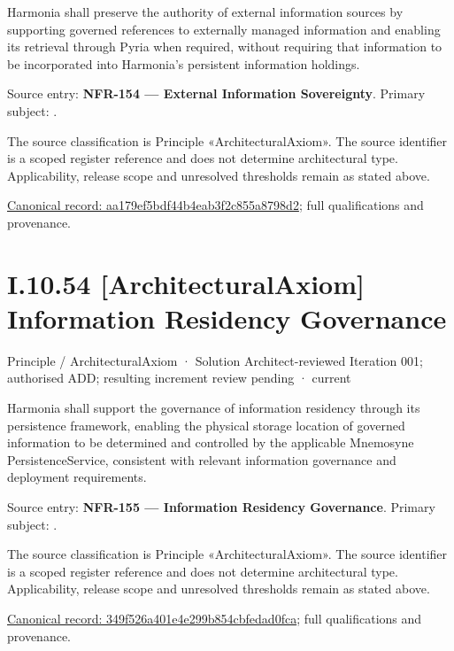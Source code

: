 Harmonia shall preserve the authority of external information sources by supporting governed references to externally managed information and enabling its retrieval through Pyria when required, without requiring that information to be incorporated into Harmonia's persistent information holdings.



Source entry: \textbf{NFR-154 — External Information Sovereignty}. Primary subject: \texttt{}.



The source classification is Principle «ArchitecturalAxiom». The source identifier is a scoped register reference and does not determine architectural type. Applicability, release scope and unresolved thresholds remain as stated above.


{\footnotesize \href{../../../../continuum/motivation/principle/architectural-axiom/aa179ef5bdf44b4eab3f2c855a8798d2.md}{Canonical record: aa179ef5bdf44b4eab3f2c855a8798d2}; full qualifications and provenance.}\par
\section*{I.10.54 [ArchitecturalAxiom] Information Residency Governance}
\label{navigation:I.10.54}

\label{element:349f526a401e4e299b854cbfedad0fca}
{\small Principle / ArchitecturalAxiom · Solution Architect-reviewed Iteration 001; authorised ADD; resulting increment review pending · current}\par

Harmonia shall support the governance of information residency through its persistence framework, enabling the physical storage location of governed information to be determined and controlled by the applicable Mnemosyne PersistenceService, consistent with relevant information governance and deployment requirements.



Source entry: \textbf{NFR-155 — Information Residency Governance}. Primary subject: \texttt{}.



The source classification is Principle «ArchitecturalAxiom». The source identifier is a scoped register reference and does not determine architectural type. Applicability, release scope and unresolved thresholds remain as stated above.


{\footnotesize \href{../../../../continuum/motivation/principle/architectural-axiom/349f526a401e4e299b854cbfedad0fca.md}{Canonical record: 349f526a401e4e299b854cbfedad0fca}; full qualifications and provenance.}\par
